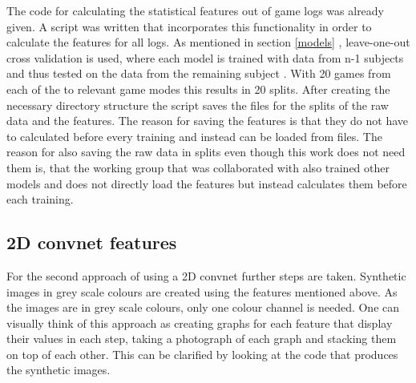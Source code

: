 The code for calculating the statistical features out of game logs was already given. A script was written that incorporates this functionality in order to calculate the features for all logs. As mentioned in section \ref{models} , leave-one-out cross validation is used, where each model is trained with data from n-1 subjects and thus tested on the data from the remaining subject \cite[Chapter~1]{oneOut}. With 20 games from each of the to relevant game modes this results in 20 splits. After creating the necessary directory structure the script saves the files for the splits of the raw data and the features. The reason for saving the features is that they do not have to calculated before every training and instead can be loaded from files. The reason for also saving the raw data in splits even though this work does not need them is, that the working group that was collaborated with also trained other models and does not directly load the features but instead calculates them before each training.

\newpage

\subsection{2D convnet features}
\label{2d_cnn_features}

For the second approach of using a 2D convnet further steps are taken. Synthetic images in grey scale colours are created using the features mentioned above. As the images are in grey scale colours, only one colour channel is needed. One can visually think of this approach as creating graphs for each feature that display their values in each step, taking a photograph of each graph and stacking them on top of each other. This can be clarified by looking at the code that produces the synthetic images. \\ 

